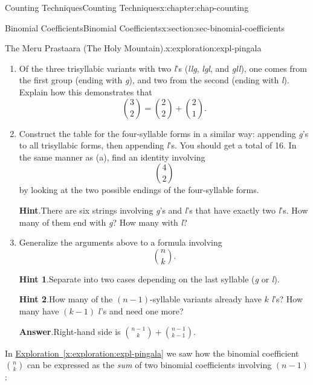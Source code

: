 \documentclass[oneside,10pt,]{book}
\newcommand{\blocktitlefont}{\relax}
\newcommand{\xreffont}{\relax}
\numberwithin{equation}{section}
\begin{document}
\begin{chapterptx}{Counting Techniques}{}{Counting Techniques}{}{}{x:chapter:chap-counting}
\begin{sectionptx}{Binomial Coefficients}{}{Binomial Coefficients}{}{}{x:section:sec-binomial-coefficients}
\begin{exploration}{The Meru Prastaara (The Holy Mountain).}{x:exploration:expl-pingala}
\begin{enumerate}[font=\bfseries,label=(\alph*),ref=\alph*]
\item{}Of the three trisyllabic variants with two \emph{l}'s (\emph{llg}, \emph{lgl}, and \emph{gll}), one comes from the first group (ending with \emph{g}), and two from the second (ending with \emph{l}). Explain how this demonstrates that%
\begin{equation*}
\binom{3}{2} = \binom{2}{2} + \binom{2}{1}\text{.}
\end{equation*}
%
\item{}Construct the table for the four-syllable forms in a similar way: appending \emph{g}'s to all trisyllabic forms, then appending \emph{l}'s. You should get a total of 16. In the same manner as (a), find an identity involving%
\begin{equation*}
\displaystyle\binom{4}{2}
\end{equation*}
by looking at the two possible endings of the four-syllable forms.%
\par\smallskip%
\noindent\textbf{\blocktitlefont Hint}.\hypertarget{g:hint:id528524}{}\quad{}There are six strings involving \emph{g}'s and \emph{l}'s that have exactly two \emph{l}'s. How many of them end with \emph{g}? How many with \emph{l}?%
\item{}Generalize the arguments above to a formula involving%
\begin{equation*}
\binom{n}{k}\text{.}
\end{equation*}
%
\par\smallskip%
\noindent\textbf{\blocktitlefont Hint 1}.\hypertarget{g:hint:id528535}{}\quad{}Separate into two cases depending on the last syllable (\emph{g} or \emph{l}).%
\par\smallskip%
\noindent\textbf{\blocktitlefont Hint 2}.\hypertarget{g:hint:id528559}{}\quad{}How many of the \((n-1)\)-syllable variants already have \(k\) \emph{l}'s? How many have \((k-1)\) \(l\)'s and need one more?%
\par\smallskip%
\noindent\textbf{\blocktitlefont Answer}.\hypertarget{g:answer:id528565}{}\quad{}Right-hand side is \(\displaystyle\binom{n-1}{k} + \binom{n-1}{k-1}\).%
\end{enumerate}
\end{exploration}%
In \hyperref[x:exploration:expl-pingala]{Exploration~{\xreffont\ref{x:exploration:expl-pingala}}} we saw how the binomial coefficient \(\displaystyle\binom{n}{k}\) can be expressed as the \emph{sum} of two binomial coefficients involving \((n-1)\):%

\end{sectionptx}
\end{chapterptx}
\end{document}
